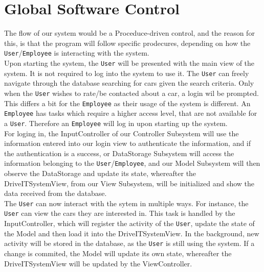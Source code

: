 \section{Global Software Control}

The flow of our system would be a Proceduce-driven control, and the reason for this, is that the program will follow specific prodecures, depending on how the \texttt{User}/\texttt{Employee} is interacting with the system.\\

Upon starting the system, the \texttt{User} will be presented with the main view of the system. It is not required to log into the system to use it. The \texttt{User} can freely navigate through the database searching for cars given the search criteria. Only when the \texttt{User} wishes to rate/be contacted about a car, a login wil be prompted.\\ 

This differs a bit for the \texttt{Employee} as their usage of the system is different. An \texttt{Employee} has tasks which require a higher access level, that are not available for a \texttt{User}. Therefore an \texttt{Employee} will log in upon starting up the system.\\

For loging in, the InputController of our Controller Subsystem will use the information entered into our login view to authenticate the information, and if the authentication is a success, or DataStorage Subsystem will access the information belonging to the \texttt{User}/\texttt{Employee}, and our Model Subsystem will then observe the DataStorage and update its state, whereafter the DriveITSystemView, from our View Subsystem, will be initialized and show the data received from the database.\\

The \texttt{User} can now interact with the sytem in multiple ways. For instance, the \texttt{User} can view the cars they are interested in. This task is handled by the InputController, which will register the activity of the \texttt{User}, update the state of the Model and then load it into the DriveITSystemView. In the background, new activity will be stored in the database, as the \texttt{User} is still using the system. If a change is commited, the Model will update its own state, whereafter the DriveITSystemView will be updated by the ViewController.\\

